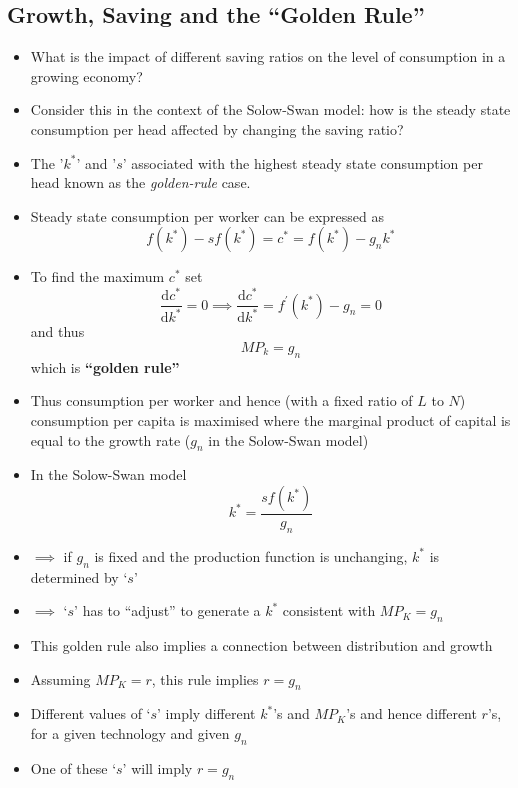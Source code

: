 \documentclass[a4paper,twoside]{article}
\numberwithin{equation}{section}
\numberwithin{figure}{section}
\begin{document}
\subsection{Growth, Saving and the ``Golden Rule''}
	\begin{itemize}
		\item What is the impact of different saving ratios on the level of consumption in a growing economy?
		\item Consider this in the context of the Solow-Swan model: how is the steady state consumption per head affected by changing the saving ratio?
		\item The '\( k^\ast \)' and '\( s \)' associated with the highest steady state consumption per head known as the \textit{golden-rule} case.
		\item Steady state consumption per worker can be expressed as
		\begin{equation}
			f(k^\ast) - sf(k^\ast) = c^\ast = f(k^\ast) - g_n k^\ast \label{eq:4.1}
		\end{equation}
		\item To find the maximum \( c^\ast \) set
		\begin{equation}
			\frac{\mathrm{d}c^\ast}{\mathrm{d}k^\ast} = 0 \implies \frac{\mathrm{d}c^\ast}{\mathrm{d}k^\ast} = f^\prime(k^\ast) - g_n = 0 \label{eq:4.2}
		\end{equation}
		and thus
		\begin{equation}
			MP_k = g_n \label{eq:4.3}
		\end{equation}
		which is \textcolor{myblue}{\textbf{``golden rule''}}
		\item Thus consumption per worker and hence (with a fixed ratio of \( L \) to \( N \)) consumption per capita is maximised where the marginal product of capital is equal to the growth rate (\( g_n \) in the Solow-Swan model)
		\item In the Solow-Swan model
		\begin{equation}
			k^\ast = \frac{sf(k^\ast)}{g_n} \label{eq:4.4}
		\end{equation}
		\item \( \implies \) if \( g_n \) is fixed and the production function is unchanging, \( k^\ast \) is determined by `\( s \)'
		\item \( \implies \) `\( s \)' has to ``adjust'' to generate a \( k^\ast \) consistent with \( MP_K = g_n \) 
		\item This golden rule also implies a connection between distribution and growth
		\item Assuming \( MP_K = r \), this rule implies \( r = g_n \)
		\item Different values of `\( s \)' imply different \( k^\ast \)'s and \( MP_K \)'s and hence different \( r \)'s, for a given technology and given \( g_n \)
		\item One of these `\( s \)' will imply \( r = g_n \) 
	\end{itemize}
\end{document}

